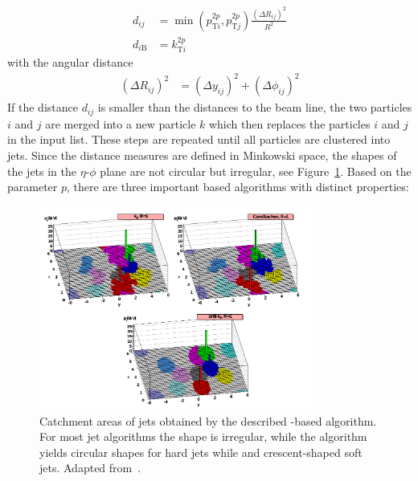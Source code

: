 \begin{align*} 
    d_{ij} &= \min(p_{\mathrm{T}i}^{2p},p_{\mathrm{T}j}^{2p})\frac{\left(\Delta
        R_{ij}\right)^2}{R^2}\\
    d_{i\mathrm{B}} &= k_{\mathrm{T}i}^{2p}
\end{align*} 
%
with the angular distance
%
\begin{align*}
    \left(\Delta R_{ij}\right)^2 &= (\Delta y_{ij})^2 + (\Delta \phi_{ij})^2
\end{align*} 
%
If the distance $d_{ij}$ is smaller than the distances to the beam line, the two
particles $i$ and $j$ are merged into a new particle $k$ which then replaces the
particles $i$ and $j$ in the input list. These steps are repeated until all
particles are clustered into jets. Since the distance measures are defined in
Minkowski space, the shapes of the jets in the $\eta$-$\phi$ plane are not circular but
irregular, see Figure~\ref{fig:jet_shapes}. Based on the parameter $p$, there
are three important \kt based algorithms with distinct properties:

\begin{figure}[htbp]
    \centering
    \includegraphics[width=0.8\textwidth]{figures/theoretical_foundations/jet_shapes.pdf}
    \caption[Jet areas of various jet algorithms]{Catchment areas of jets
        obtained by the described \kt-based algorithm. For most jet algorithms the shape is
        irregular, while the \antikt algorithm yields circular shapes for hard
        jets while and crescent-shaped soft jets. Adapted
        from~\cite{Salam:2009jx}.}
    \label{fig:jet_shapes}
\end{figure}

